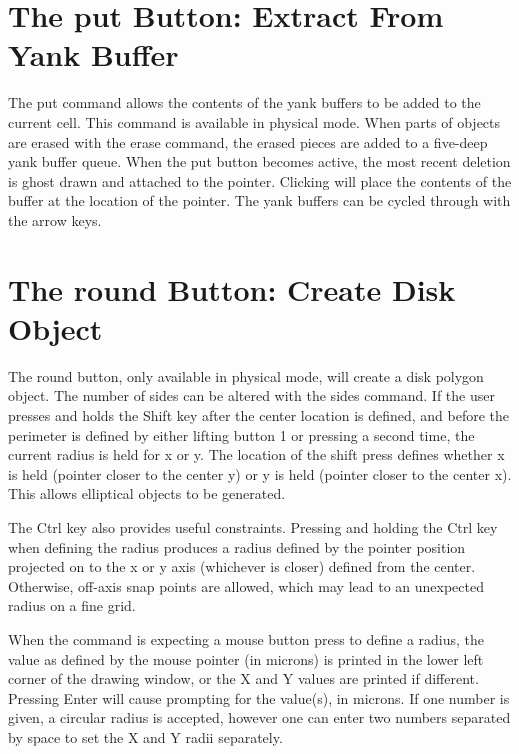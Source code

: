 \section{The {\cb put} Button: Extract From Yank Buffer}

The {\cb put} command allows the contents of the yank buffers to be
added to the current cell.  This command is available in physical
mode.  When parts of objects are erased with the {\cb erase} command,
the erased pieces are added to a five-deep yank buffer queue.  When
the {\cb put} button becomes active, the most recent deletion is ghost
drawn and attached to the pointer.  Clicking will place the contents
of the buffer at the location of the pointer.  The yank buffers can be
cycled through with the arrow keys.


\section{The {\cb round} Button: Create Disk Object}

The {\cb round} button, only available in physical mode, will create a
disk polygon object.  The number of sides can be altered with the {\cb
sides} command.  If the user presses and holds the {\kb Shift} key
after the center location is defined, and before the perimeter is
defined by either lifting button 1 or pressing a second time, the
current radius is held for x or y.  The location of the shift press
defines whether x is held (pointer closer to the center y) or y is
held (pointer closer to the center x).  This allows elliptical objects
to be generated.

The {\kb Ctrl} key also provides useful constraints.  Pressing and
holding the {\kb Ctrl} key when defining the radius produces a radius
defined by the pointer position projected on to the {\et x} or {\et y}
axis (whichever is closer) defined from the center.  Otherwise,
off-axis snap points are allowed, which may lead to an unexpected
radius on a fine grid.

When the command is expecting a mouse button press to define a radius,
the value as defined by the mouse pointer (in microns) is printed in
the lower left corner of the drawing window, or the X and Y values are
printed if different.  Pressing {\kb Enter} will cause prompting for
the value(s), in microns.  If one number is given, a circular radius
is accepted, however one can enter two numbers separated by space to
set the X and Y radii separately.


